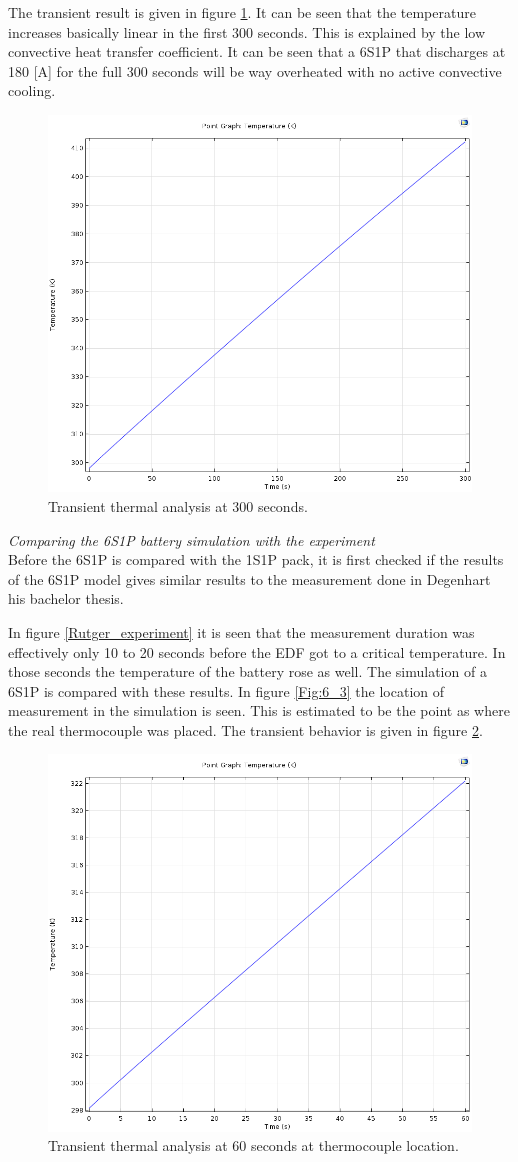 The transient result is given in figure \ref{Fig:Transient_10h_300s}. It can be seen that the temperature increases basically linear in the first 300 seconds. This is explained by the low convective heat transfer coefficient. It can be seen that a 6S1P that discharges at 180 [A] for the full 300 seconds will be way overheated with no active convective cooling.

\begin{figure} [H]
	\centering
	\includegraphics[width=0.5\linewidth]{Figures/300s_10h_180A_2mOhm.png}
	\caption{Transient thermal analysis at 300 seconds.}
   \label{Fig:Transient_10h_300s}
\end{figure}

\textit{Comparing the 6S1P battery simulation with the experiment}\\
Before the 6S1P is compared with the 1S1P pack, it is first checked if the results of the 6S1P model gives similar results to the measurement done in Degenhart his bachelor thesis.

In figure \ref{Rutger_experiment} it is seen that the measurement duration was effectively only 10 to 20 seconds before the EDF got to a critical temperature. In those seconds the temperature of the battery rose as well. The simulation of a 6S1P is compared with these results. In figure \ref{Fig:6_3} the location of measurement in the simulation is seen. This is estimated to be the point as where the real thermocouple was placed. The transient behavior is given in figure \ref{Fig:Transient_10h_60s}.

\begin{figure} [H]
	\centering
	\includegraphics[width=0.5\linewidth]{Figures/60s_10h_180A_2mOhm.png}
	\caption{Transient thermal analysis at 60 seconds at thermocouple location.}
   \label{Fig:Transient_10h_60s}
\end{figure}


